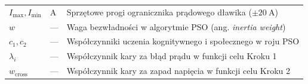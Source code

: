 \begin{tabular}{lll}
    $I_{\max}, I_{\min}$ & A & Sprzętowe progi ogranicznika prądowego dławika ($\pm 20~\mathrm{A}$) \\
    $w$ & --- & Waga bezwładności w algorytmie PSO (ang. \emph{inertia weight}) \\
    $c_1, c_2$ & --- & Współczynniki uczenia kognitywnego i społecznego w roju PSO \\
    $\lambda_i$ & --- & Współczynnik kary za błąd prądu w funkcji celu Kroku 1 \\
    $w_{\mathrm{cross}}$ & --- & Współczynnik kary za zapad napięcia w funkcji celu Kroku 2 \\
\end{tabular}
